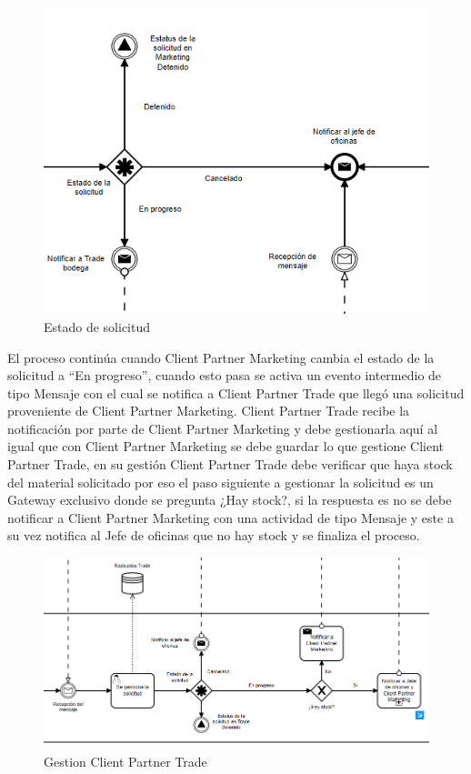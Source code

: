 \begin{figure}[H]
	\centering
	\includegraphics[scale=0.5]{Capitulo4/imagenes/5.png}
	\caption{Estado de solicitud}
	\label{Esol}
\end{figure}

El proceso continúa cuando Client Partner Marketing cambia el estado de la solicitud a ``En progreso'', cuando esto pasa se activa un evento intermedio de tipo Mensaje con el cual se notifica a Client Partner Trade que llegó una solicitud proveniente de Client Partner Marketing. Client Partner Trade recibe la notificación por parte de Client Partner Marketing y debe gestionarla aquí al igual que con Client Partner Marketing se debe guardar lo que gestione Client Partner Trade, en su gestión Client Partner Trade debe verificar que haya stock del material solicitado por eso el paso siguiente a gestionar la solicitud es un Gateway exclusivo donde se pregunta ¿Hay stock?, si la respuesta es no se debe notificar a Client Partner Marketing con una actividad de tipo Mensaje y este a su vez notifica al Jefe de oficinas que no hay stock y se finaliza el proceso.

\begin{figure}[H]
	\centering
	\includegraphics[scale=0.5]{Capitulo4/imagenes/6.png}
	\caption{Gestion Client Partner Trade}
	\label{Esol2}
\end{figure}

